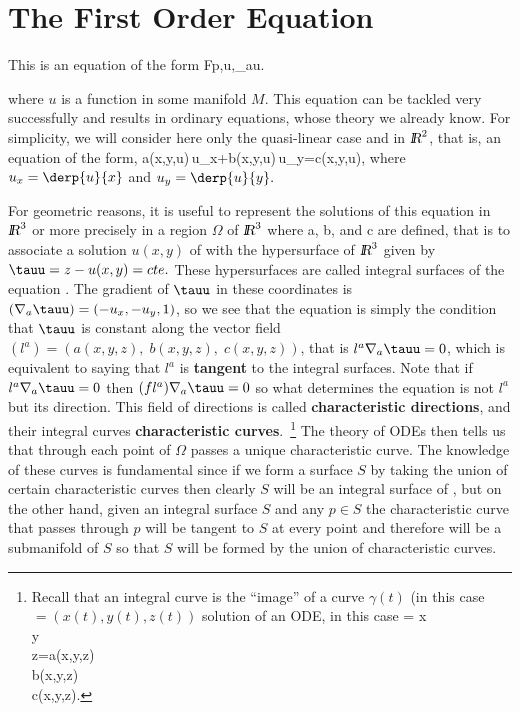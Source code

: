 \section{The First Order Equation}

\noi
This is an equation of the form
\beq
F\lp p,u,\na_au.
\eeq

\noi
where $u$ is a function in some manifold $M$.
This equation can be tackled very successfully and results in ordinary equations, whose theory we already know.
For simplicity, we will consider here only the quasi-linear case and in $\mbox{\sl {l$\!\!\!\;\:\!$R}}^2$, that is, an equation of the form,
\beq
a(x,y,u)\,u_x+b(x,y,u)\,u_y=c(x,y,u),
\label{ot*}
\eeq
where $u_x = \derp{u}{x}$ and $u_y=\derp{u}{y}.$

For geometric reasons, it is useful to represent the solutions of this equation in $\mbox{\sl {l$\!\!\!\;\:\!$R}}^3$ or more precisely in a region $\Omega$ of $\mbox{\sl {l$\!\!\!\;\:\!$R}}^3$ where a, b, and c are defined,
that is to associate a solution $u(x,y)$ of  with the hypersurface of $\mbox{\sl {l$\!\!\!\;\:\!$R}}^3$ given by $\tauu=z-u(x,y)=cte.$ 
These hypersurfaces are called integral surfaces of the equation . The gradient of $\tauu$ in these coordinates is
$(\na_a\tauu) = (-u_x,-u_y,1)$, so we see that the equation  is simply the condition
that $\tauu$ is constant along the vector field 
$(l^a)=(a(x,y,z),\;b(x,y,z),\;c(x,y,z))$, 
that is $l^a\na_a\tauu=0$,
which is equivalent to saying that $l^a$ is {\bf tangent} to the integral surfaces. Note that if $l^a\na_a\tauu=0$ then $(fl^a)\na_a\tauu=0$ 
so what determines the equation
 is not $l^a$ but its direction. 
This field of directions is called
{\bf characteristic directions}, and their integral curves {\bf characteristic curves}.~\footnote{Recall that an integral curve is the 
``image'' of a curve $\gamma(t)$ (in this case $=(x(t),y(t),z(t))$ solution of an ODE, 
in this case 
\beq
{}=\lp{} x\\ y\\ z\earr\rp=\lp{}a(x,y,z)\\
b(x,y,z)\\c(x,y,z)\earr\rp.
\eeq}
The theory of ODEs then tells us that through each point of $\Omega$ passes a unique characteristic curve. The knowledge of these curves is
fundamental since if we form a surface $S$ by taking the union of
certain characteristic curves then clearly $S$ will be an
integral surface of , but on the other hand, given an integral surface $S$ and any $p\in S$ the characteristic curve that passes through $p$
will be tangent to $S$ at every point and therefore will be a
submanifold of $S$ so that $S$ will be formed by the
union of characteristic curves.

